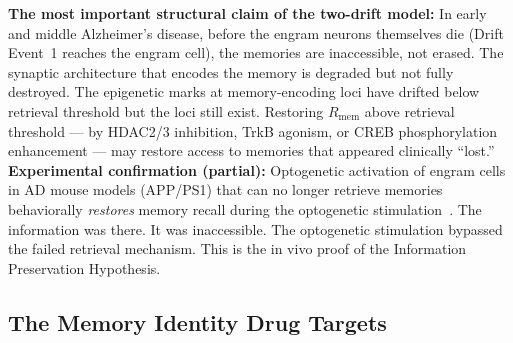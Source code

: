 \documentclass[12pt,a4paper]{article}
\newenvironment{warnenv}{%
  \begin{tcolorbox}[colback=red!5,colframe=warnbox,boxrule=1pt,
    arc=3pt,left=8pt,right=8pt,top=6pt,bottom=6pt,breakable]}{%
  \end{tcolorbox}}
\newcommand{\RMEM}{R_{\mathrm{mem}}}
\begin{document}
\begin{warnenv}
\textbf{The most important structural claim of the
two-drift model:} In early and middle Alzheimer's
disease, before the engram neurons themselves die
(Drift Event~1 reaches the engram cell), the memories
are inaccessible, not erased. The synaptic architecture
that encodes the memory is degraded but not fully
destroyed. The epigenetic marks at memory-encoding loci
have drifted below retrieval threshold but the loci
still exist. Restoring $\RMEM$ above retrieval threshold
--- by HDAC2/3 inhibition, TrkB agonism, or CREB
phosphorylation enhancement --- may restore access
to memories that appeared clinically ``lost.''\\[4pt]
\textbf{Experimental confirmation (partial):}
Optogenetic activation of engram cells in AD mouse
models (APP/PS1) that can no longer retrieve memories
behaviorally \emph{restores} memory recall during the
optogenetic stimulation~\cite{Roy2016}. The information
was there. It was inaccessible. The optogenetic
stimulation bypassed the failed retrieval mechanism.
This is the in vivo proof of the Information Preservation
Hypothesis.
\end{warnenv}

\subsection{The Memory Identity Drug Targets}
\end{document}
